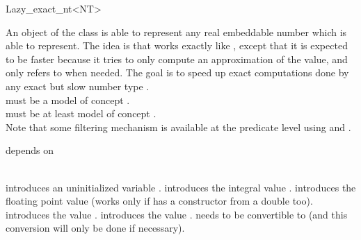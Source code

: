 
\begin{ccRefClass} {Lazy_exact_nt<NT>}
\label{lazy_exact_nt}

\ccDefinition
An object of the class  is able to represent any 
real embeddable number which  is able to represent.
The idea is that  works exactly like , except
that it is expected to be faster because it tries to only compute an 
approximation of the value, and only refers to  when needed.  
The goal is to speed up exact computations done by any exact but slow 
number type .\\

 must be a model of concept . \\
 must be at least model of concept .\\


Note that some filtering mechanism is available at the predicate level
using  and .


\ccIsModel
{} depends on  \\
\\
        
        

\ccCreation
{}

{introduces an uninitialized variable \ccVar.}
\ccGlue
{}
{introduces the integral value .}
\ccGlue
{}
{introduces the floating point value  (works only if  has a
constructor from a double too).}
\ccGlue
{}
{introduces the value .}
\ccGlue
{}
{introduces the value .  needs to be convertible to 
(and this conversion will only be done if necessary).}

\ccOperations


\end{ccRefClass}
